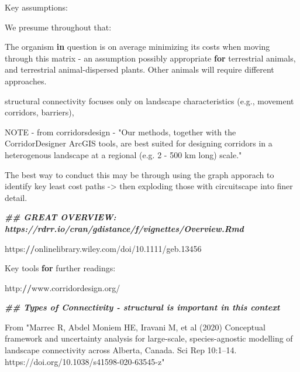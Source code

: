 \documentclass[
]{book}
\newenvironment{Shaded}{\begin{snugshade}}{\end{snugshade}}
\newcommand{\ControlFlowTok}[1]{\textcolor[rgb]{0.13,0.29,0.53}{\textbf{#1}}}
\newcommand{\DocumentationTok}[1]{\textcolor[rgb]{0.56,0.35,0.01}{\textbf{\textit{#1}}}}
\newcommand{\ErrorTok}[1]{\textcolor[rgb]{0.64,0.00,0.00}{\textbf{#1}}}
\newcommand{\FloatTok}[1]{\textcolor[rgb]{0.00,0.00,0.81}{#1}}
\newcommand{\FunctionTok}[1]{\textcolor[rgb]{0.00,0.00,0.00}{#1}}
\newcommand{\NormalTok}[1]{#1}
\newcommand{\OtherTok}[1]{\textcolor[rgb]{0.56,0.35,0.01}{#1}}
\newcommand{\SpecialCharTok}[1]{\textcolor[rgb]{0.00,0.00,0.00}{#1}}
\newcommand{\StringTok}[1]{\textcolor[rgb]{0.31,0.60,0.02}{#1}}
\begin{document}
\begin{Shaded}
\begin{Highlighting}[]
\NormalTok{Key assumptions}\SpecialCharTok{:}

\NormalTok{We presume throughout that}\SpecialCharTok{:}

\NormalTok{ The organism }\ControlFlowTok{in}\NormalTok{ question is on average minimizing its costs when moving through this matrix }\SpecialCharTok{{-}}\NormalTok{ an assumption possibly appropriate }\ControlFlowTok{for}\NormalTok{ terrestrial animals, and terrestrial animal}\SpecialCharTok{{-}}\NormalTok{dispersed plants. Other animals will require different approaches.}

\NormalTok{structural connectivity focuses only on landscape }\FunctionTok{characteristics}\NormalTok{ (e.g., movement corridors, barriers),}


\NormalTok{NOTE }\SpecialCharTok{{-}}\NormalTok{ from corridorsdesign }\SpecialCharTok{{-}} \StringTok{"Our methods, together with the CorridorDesigner ArcGIS tools, are best suited for designing corridors in a heterogenous landscape at a regional (e.g. 2 {-} 500 km long) scale."}

\NormalTok{The best way to conduct this may be through using the graph apporach to identify key least cost paths }\OtherTok{{-}\textgreater{}}\NormalTok{ then exploding those with circuitscape into finer detail.}


\DocumentationTok{\#\# GREAT OVERVIEW: https://rdrr.io/cran/gdistance/f/vignettes/Overview.Rmd }


\NormalTok{https}\SpecialCharTok{:}\ErrorTok{//}\NormalTok{onlinelibrary.wiley.com}\SpecialCharTok{/}\NormalTok{doi}\SpecialCharTok{/}\FloatTok{10.1111}\SpecialCharTok{/}\NormalTok{geb}\FloatTok{.13456} 



\NormalTok{Key tools }\ControlFlowTok{for}\NormalTok{ further readings}\SpecialCharTok{:}

\NormalTok{http}\SpecialCharTok{:}\ErrorTok{//}\NormalTok{www.corridordesign.org}\SpecialCharTok{/}


\DocumentationTok{\#\# Types of Connectivity {-} structural is important in this context}

\NormalTok{From }\StringTok{"Marrec R, Abdel Moniem HE, Iravani M, et al (2020) Conceptual framework and uncertainty analysis for large{-}scale, species{-}agnostic modelling of landscape connectivity across Alberta, Canada. Sci Rep 10:1–14. https://doi.org/10.1038/s41598{-}020{-}63545{-}z"}


\end{Highlighting}
\end{Shaded}
\end{document}
